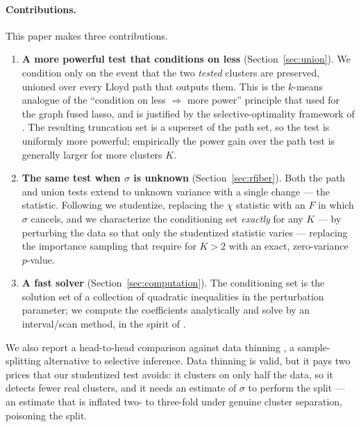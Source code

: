 \documentclass[11pt]{article}
\begin{document}
\paragraph{Contributions.} This paper makes three contributions.
\begin{enumerate}
  \item \textbf{A more powerful test that conditions on less}
        (Section~\ref{sec:union}). We condition only on the event that the two
        \emph{tested} clusters are preserved, unioned over every Lloyd path that
        outputs them. This is the $k$-means analogue of the
        ``condition on less $\Rightarrow$ more power'' principle that
        \citet{chen2023gfl} used for the graph fused lasso, and is justified by
        the selective-optimality framework of \citet{fithian2017optimal}. The
        resulting truncation set is a superset of the path set, so the test is
        uniformly more powerful; empirically the power gain over the path test is
        generally larger for more clusters $K$.
  \item \textbf{The same test when $\sigma$ is unknown}
        (Section~\ref{sec:rfiber}). Both the path and union tests extend to
        unknown variance with a single change --- the statistic. Following
        \citet{yun2023unknownvar} we studentize, replacing the $\chi$ statistic
        with an $F$ in which $\sigma$ cancels, and we characterize the
        conditioning set \emph{exactly} for any $K$ --- by perturbing the data so
        that only the studentized statistic varies --- replacing the importance
        sampling that \citet{yun2023unknownvar} require for $K>2$ with an exact,
        zero-variance $p$-value.
  \item \textbf{A fast solver} (Section~\ref{sec:computation}). The conditioning
        set is the solution set of a collection of quadratic inequalities in the
        perturbation parameter; we compute the coefficients analytically and
        solve by an interval/scan method, in the spirit of
        \citet{yun2024multiplepairs}.
\end{enumerate}

We also report a head-to-head comparison against data thinning
\citep{neufeld2024datathin,dharamshi2024generalized}, a sample-splitting
alternative to selective inference. Data thinning is valid, but it pays two
prices that our studentized test avoids: it clusters on only half the data, so it
detects fewer real clusters, and it needs an estimate of $\sigma$ to perform the
split --- an estimate that is inflated two- to three-fold under genuine cluster
separation, poisoning the split.
\end{document}
